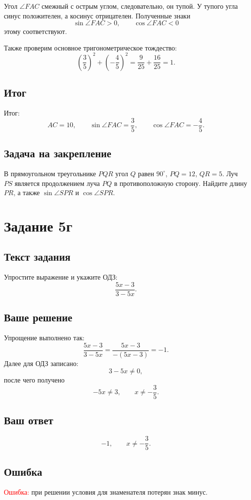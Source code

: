\documentclass[12pt,a4paper]{article}
\begin{document}
Угол $\angle FAC$ смежный с острым углом, следовательно, он тупой. У тупого угла синус положителен, а косинус отрицателен. Полученные знаки
\[
\sin\angle FAC>0,\qquad \cos\angle FAC<0
\]
этому соответствуют.

Также проверим основное тригонометрическое тождество:
\[
\left(\frac35\right)^2+\left(-\frac45\right)^2
=\frac9{25}+\frac{16}{25}
=1.
\]

\subsection*{Итог}
\textcolor{teal!60!black}{Итог:}
\[
AC=10,\qquad
\sin\angle FAC=\frac35,\qquad
\cos\angle FAC=-\frac45.
\]

\subsection*{Задача на закрепление}
В прямоугольном треугольнике $PQR$ угол $Q$ равен $90^\circ$, $PQ=12$, $QR=5$. Луч $PS$ является продолжением луча $PQ$ в противоположную сторону. Найдите длину $PR$, а также $\sin\angle SPR$ и $\cos\angle SPR$.

\newpage
{}\label{task:5d}
\section*{Задание 5г}

\subsection*{Текст задания}
Упростите выражение и укажите ОДЗ:
\[
\frac{5x-3}{3-5x}.
\]

\subsection*{Ваше решение}
Упрощение выполнено так:
\[
\frac{5x-3}{3-5x}
=
\frac{5x-3}{-(5x-3)}
=
-1.
\]
Далее для ОДЗ записано:
\[
3-5x\ne0,
\]
после чего получено
\[
-5x\ne3,
\qquad
x\ne-\frac35.
\]

\subsection*{Ваш ответ}
\[
-1,\qquad x\ne-\frac35.
\]

\subsection*{Ошибка}
\textcolor{red}{Ошибка:} при решении условия для знаменателя потерян знак минус.
\end{document}
